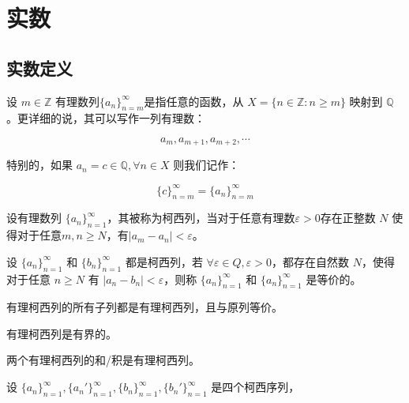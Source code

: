 \section{实数}

\subsection{实数定义}

\begin{definition}[有理数列]
	设 $m\in \mathbb Z$ 有理数列$\{a_n\}_{n=m}^\infty$是指任意的函数，从 $X=\{n\in \mathbb Z:n\ge m\}$ 映射到 $\mathbb Q$。更详细的说，其可以写作一列有理数：
	
	$$
	a_m,a_{m+1},a_{m+2},\cdots
	$$
\end{definition}

\maketip 特别的，如果 $a_n=c\in \mathbb Q,\forall n\in X$ 则我们记作：

$$
\{c\}_{n=m}^\infty = \{a_n\}_{n=m}^\infty
$$

\begin{definition}[有理柯西列]
	设有理数列 $\{a_n\}_{n=1}^\infty$，其被称为柯西列，当对于任意有理数$\varepsilon>0$存在正整数 $N$ 使得对于任意$m,n\ge N$，有$|a_m-a_n|< \varepsilon$。
\end{definition}

\begin{definition}[有理柯西列的等价性]
	设 $\{a_n\}_{n=1}^\infty$ 和 $\{b_n\}_{n=1}^\infty$ 都是柯西列，若 $\forall \varepsilon \in Q,\varepsilon > 0$，都存在自然数 $N$，使得对于任意 $n\ge N$ 有 $|a_n-b_n|< \varepsilon$，则称 $\{a_n\}_{n=1}^\infty$ 和 $\{a_n\}_{n=1}^\infty$ 是等价的。
\end{definition}

\begin{lemma}[有理柯西列的子列]
	有理柯西列的所有子列都是有理柯西列，且与原列等价。
\end{lemma}

\begin{lemma}[有界性]
	有理柯西列是有界的。
\end{lemma}

\begin{lemma}[加法、乘法封闭性]
	两个有理柯西列的和/积是有理柯西列。
\end{lemma}

\begin{lemma}
	设 $\{a_n\}^\infty_{n=1},\{a_n'\}^\infty_{n=1},\{b_n\}^\infty_{n=1},\{b_n'\}^\infty_{n=1}$ 是四个柯西序列，
\end{lemma}

